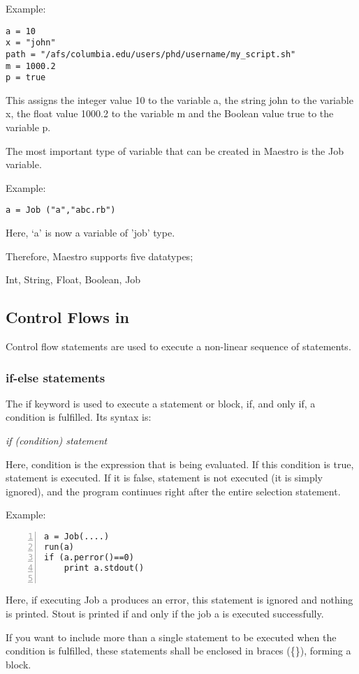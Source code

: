 Example:
\begin{verbatim}
a = 10
x = "john"
path = "/afs/columbia.edu/users/phd/username/my_script.sh"
m = 1000.2
p = true
\end{verbatim}

This assigns the integer value 10 to the variable a, the string john to the variable x, the float value 1000.2 to the variable m and the Boolean value true to the variable p.

The most important type of variable that can be created in Maestro is the Job variable.

Example:
\begin{verbatim}
a = Job ("a","abc.rb")
\end{verbatim}

Here, `a' is now a variable of 'job' type. 

Therefore, Maestro supports five datatypes;

Int, String, Float, Boolean, Job

\subsection*{Control Flows in \lang{}}
Control flow statements are used to execute a non-linear sequence of statements.
\subsubsection*{if-else statements}
The if keyword is used to execute a statement or block, if, and only if, a condition is fulfilled. Its syntax is:

\textit{if (condition) statement}

Here, condition is the expression that is being evaluated. If this condition is true, statement is executed. If it is false, statement is not executed (it is simply ignored), and the program continues right after the entire selection statement.

Example:
\begin{Verbatim}[numbers=left]
a = Job(....)
run(a)
if (a.perror()==0)
    print a.stdout()
    
\end{Verbatim}

Here, if executing Job a produces an error, this statement is ignored and nothing is printed. Stout is printed if and only if the job a is executed successfully.

If you want to include more than a single statement to be executed when the condition is fulfilled, these statements shall be enclosed in braces (\{\}), forming a block.

